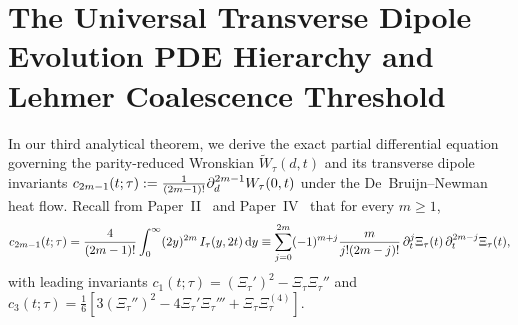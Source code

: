 \documentclass[11pt,reqno]{amsart}
\theoremstyle{definition}
\theoremstyle{remark}
\numberwithin{equation}{section}
\newcommand{\dd}{\mathrm{d}}
\newcommand{\fac}{\mathclose{\mathchar"0021}}
\begin{document}
\section{The Universal Transverse Dipole Evolution PDE Hierarchy and Lehmer Coalescence Threshold}\label{sec:dipole_hierarchy}

In our third analytical theorem, we derive the exact partial differential equation governing the parity-reduced Wronskian $\widetilde{W}_\tau(d,t)$ and its transverse dipole invariants $c_{2m-1}(t;\tau) := \frac{1}{(2m-1)\fac}\partial_d^{2m-1}W_\tau(0,t)$ under the De~Bruijn--Newman heat flow. Recall from Paper~II~\cite{missiaen2026paper2} and Paper~IV~\cite{missiaen2026paper4} that for every $m \ge 1$,
\begin{equation}\label{eq:c2m_definition}
c_{2m-1}(t;\tau) = \frac{4}{(2m-1)\fac}\int_0^{\infty} (2y)^{2m}\,I_\tau(y, 2t)\,\dd y \equiv \sum_{j=0}^{2m} (-1)^{m+j}\frac{m}{j\fac(2m-j)\fac}\,\partial_t^j\Xi_\tau(t)\,\partial_t^{2m-j}\Xi_\tau(t),
\end{equation}
with leading invariants $c_1(t;\tau) = (\Xi_\tau')^2 - \Xi_\tau\Xi_\tau''$ and $c_3(t;\tau) = \frac{1}{6}[3(\Xi_\tau'')^2 - 4\Xi_\tau'\Xi_\tau''' + \Xi_\tau\Xi_\tau^{(4)}]$.
\end{document}
